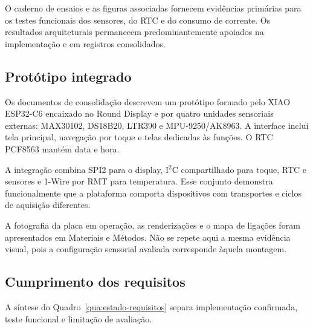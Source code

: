 \documentclass[a4paper,12pt]{article}
\begin{document}
O caderno de ensaios e as figuras associadas fornecem evid\^encias prim\'arias para os testes funcionais dos sensores, do RTC e do consumo de corrente. Os resultados arquiteturais permanecem predominantemente apoiados na implementa\c{c}\~ao e em registros consolidados.


\subsection{Prot\'otipo integrado}


Os documentos de consolida\c{c}\~ao descrevem um prot\'otipo formado pelo XIAO ESP32-C6 encaixado no Round Display e por quatro unidades sensoriais externas: MAX30102, DS18B20, LTR390 e MPU-9250/AK8963. A interface inclui tela principal, navega\c{c}\~ao por toque e telas dedicadas \`as fun\c{c}\~oes. O RTC PCF8563 mant\'em data e hora.


A integra\c{c}\~ao combina SPI2 para o display, I$^2$C compartilhado para toque, RTC e sensores e 1-Wire por RMT para temperatura. Esse conjunto demonstra funcionalmente que a plataforma comporta dispositivos com transportes e ciclos de aquisi\c{c}\~ao diferentes.


A fotografia da placa em opera\c{c}\~ao, as renderiza\c{c}\~oes e o mapa de liga\c{c}\~oes foram apresentados em Materiais e M\'etodos. N\~ao se repete aqui a mesma evid\^encia visual, pois a configura\c{c}\~ao sensorial avaliada corresponde \`aquela montagem.


\subsection{Cumprimento dos requisitos}


A s\'intese do Quadro~\ref{qua:estado-requisitos} separa implementa\c{c}\~ao confirmada, teste funcional e limita\c{c}\~ao de avalia\c{c}\~ao.
\end{document}

